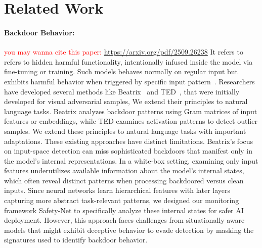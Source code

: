 \section{Related Work} \label{sec:related_work}

\paragraph{Backdoor Behavior:} 
\textcolor{red}{you may wanna cite this paper: \url{https://arxiv.org/pdf/2509.26238}}
It refers to  refers to hidden harmful functionality, intentionally infused inside the model via fine-tuning or training. Such models behaves normally on regular input but exhibits harmful behavior when triggered by specific input pattern~\cite{randoUniversalJailbreakBackdoors2024}.
Researchers have developed several methods like Beatrix~\cite{maBeatrixResurrectionsRobust2022} and TED~\cite{ted}, that were initially developed for visual adversarial samples, We extend their principles to natural language tasks. Beatrix analyzes backdoor patterns using Gram matrices of input features or embeddings, while TED examines activation patterns to detect outlier samples. 
We extend these principles to natural language tasks with important adaptations.
These existing approaches have distinct limitations. Beatrix's focus on input-space detection can miss sophisticated backdoors that manifest only in the model's internal representations. In a white-box setting, examining only input features underutilizes available information about the model's internal states, which often reveal distinct patterns when processing backdoored versus clean inputs. 
Since neural networks learn hierarchical features with later layers capturing more abstract task-relevant patterns, we designed our monitoring framework Safety-Net to specifically analyze these internal states for safer AI deployment. However, this approach faces challenges from situationally aware models that might exhibit deceptive behavior to evade detection by masking the signatures used to identify backdoor behavior.



